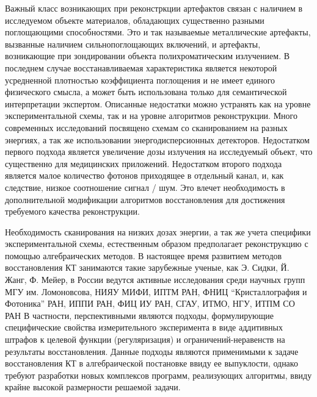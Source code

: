 Важный класс возникающих при реконстркции артефактов связан с наличием в исследуемом объекте материалов, обладающих существенно разными поглощающими способностями.
Это и так называемые металлические артефакты, вызванные наличием сильнопоглощающих включений, и артефакты, возникающие при зондировании объекта полихроматическим излучением.
В последнем случае восстанавливаемая характеристика является некоторой усредненной плотностью коэффициента поглощения и не имеет единого физического смысла, а может быть использована только для семантической интерпретации экспертом.
Описанные недостатки можно устранять как на уровне экспериментальной схемы, так и на уровне алгоритмов реконструкции.
Много современных исследований посвящено схемам со сканированием на разных энергиях, а так же использовании энергодисперсионных детекторов.
Недостатком первого подхода является увеличение дозы излучения на исследуемый объект, что существенно для медицинских приложений.
Недостатком второго подхода является малое количество фотонов приходящее в отдельный канал, и, как следствие, низкое соотношение сигнал / шум. 
Это влечет необходимость в дополнительной модификации алгоритмов восстановления для достижения требуемого качества реконструкции.

Необходимость сканирования на низких дозах энергии, а так же учета специфики экспериментальной схемы, естественным образом предполагает реконструкцию с помощью алгебраических методов.
В настоящее время развитием методов восстановления КТ занимаются такие зарубежные ученые, как Э. Сидки, Й. Жанг, Ф. Мейер, в России ведутся активные исследования среди научных групп МГУ им. Ломоновсова, НИЯУ МИФИ, ИПТМ РАН, ФНИЦ ``Кристаллография и Фотоника'' РАН, ИППИ РАН, ФИЦ ИУ РАН, СГАУ, ИТМО, НГУ, ИТПМ СО РАН
В частности, перспективными являются подходы, формулирующие специфические свойства измерительного эксперимента в виде аддитивных штрафов к целевой функции (регуляризация) и ограничений-неравенств на результаты восстановления.
Данные подходы являются применимыми к задаче восстановления КТ в алгебраической постановке ввиду ее выпуклости, однако требуют разработки новых комплексов программ, реализующих алгоритмы, ввиду крайне высокой размерности решаемой задачи.






